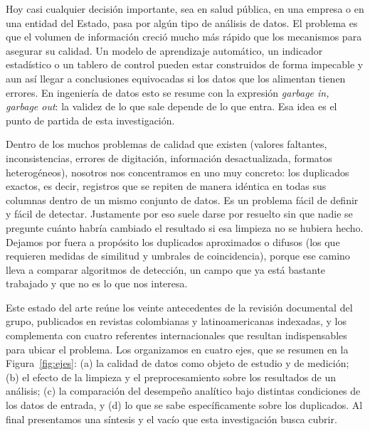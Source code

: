\documentclass[11pt,openany,oneside,letterpaper]{book}
\begin{document}
Hoy casi cualquier decisión importante, sea en salud pública, en una empresa o en una entidad del Estado, pasa por algún tipo de análisis de datos. El problema es que el volumen de información creció mucho más rápido que los mecanismos para asegurar su calidad. Un modelo de aprendizaje automático, un indicador estadístico o un tablero de control pueden estar construidos de forma impecable y aun así llegar a conclusiones equivocadas si los datos que los alimentan tienen errores. En ingeniería de datos esto se resume con la expresión \emph{garbage in, garbage out}: la validez de lo que sale depende de lo que entra. Esa idea es el punto de partida de esta investigación.

Dentro de los muchos problemas de calidad que existen (valores faltantes, inconsistencias, errores de digitación, información desactualizada, formatos heterogéneos), nosotros nos concentramos en uno muy concreto: los duplicados exactos, es decir, registros que se repiten de manera idéntica en todas sus columnas dentro de un mismo conjunto de datos. Es un problema fácil de definir y fácil de detectar. Justamente por eso suele darse por resuelto sin que nadie se pregunte cuánto habría cambiado el resultado si esa limpieza no se hubiera hecho. Dejamos por fuera a propósito los duplicados aproximados o difusos (los que requieren medidas de similitud y umbrales de coincidencia), porque ese camino lleva a comparar algoritmos de detección, un campo que ya está bastante trabajado y que no es lo que nos interesa.

Este estado del arte reúne los veinte antecedentes de la revisión documental del grupo, publicados en revistas colombianas y latinoamericanas indexadas, y los complementa con cuatro referentes internacionales que resultan indispensables para ubicar el problema. Los organizamos en cuatro ejes, que se resumen en la Figura~\ref{fig:ejes}: (a) la calidad de datos como objeto de estudio y de medición; (b) el efecto de la limpieza y el preprocesamiento sobre los resultados de un análisis; (c) la comparación del desempeño analítico bajo distintas condiciones de los datos de entrada, y (d) lo que se sabe específicamente sobre los duplicados. Al final presentamos una síntesis y el vacío que esta investigación busca cubrir.
\end{document}
